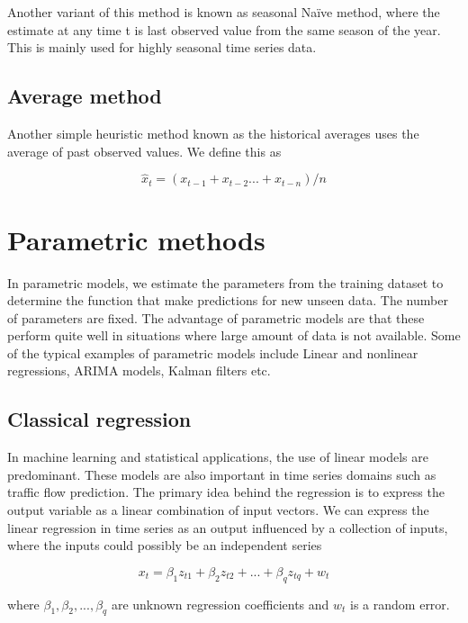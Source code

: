 Another variant of this method is known as seasonal Naïve method, where the estimate at any time t is
last observed value from the same season of the year. This is mainly used for highly seasonal time
series data.

\subsection{Average method}
Another simple heuristic method known as the historical averages uses the average of past observed
values. We define this as

        \begin{equation}
            \hat{x}_{t} = (x_{t-1} + x_{t-2} ... + x_{t-n})/n
        \end{equation}

\section{Parametric methods}
In parametric models, we estimate the parameters from the training dataset to determine the
function that make predictions for new unseen data. The number of parameters are fixed. The advantage of
parametric models are that these perform quite well in situations where large amount of data
is not available. Some of the typical examples of parametric models include Linear and
nonlinear regressions, ARIMA models, Kalman filters etc.

\subsection{Classical regression}
In machine learning and statistical applications, the use of linear models are predominant. These
models are also important in time series domains such as traffic flow prediction. The primary
idea behind the regression is to express the output variable as a linear combination of input
vectors. We can express the linear regression in time series as an output influenced by a
collection of inputs, where the inputs could possibly be an independent series

        \begin{equation}
            x_{t} = \beta_{1}z_{t1} + \beta_{2}z_{t2} + ... + \beta_{q}z_{tq} + w_{t}
        \end{equation}

where $ \beta_{1}, \beta_{2},...,\beta_{q} $ are unknown regression coefficients and $w_{t}$ is
a random error.

